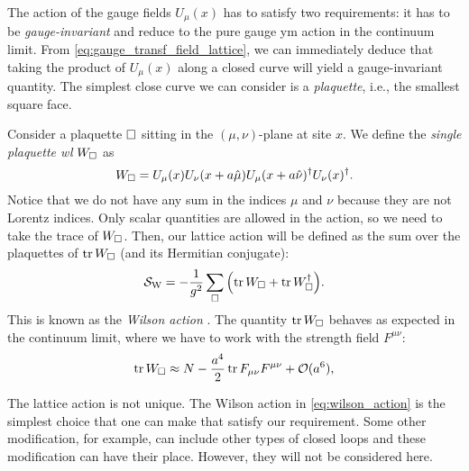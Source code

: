 The action of the gauge fields $U_{\mu}(x)$ has to satisfy two requirements:
it has to be \emph{gauge-invariant} and reduce to the pure gauge \ac{ym} action in the continuum limit.
From \eqref{eq:gauge_transf_field_lattice}, we can immediately deduce that taking the product of $U_{\mu}(x)$ along a closed curve will yield a gauge-invariant quantity.
The simplest close curve we can consider is a \emph{plaquette}, i.e., the smallest square face.

Consider a plaquette $\square$ sitting in the $(\mu, \nu)$-plane at site $x$.
We define the \emph{single plaquette \acl{wl}} $W_{\square}$ as
\begin{equation}
    W_{\square} =
    U_{\mu}(x) U_{\nu}(x + a \hat{\mu}) U_{\mu}(x + a \hat{\nu})^{\dagger} U_{\nu}(x)^{\dagger}.
    \label{eq:single_plaquette_Wilson_loop}
\end{equation}
Notice that we do not have any sum in the indices $\mu$ and $\nu$ because they are not Lorentz indices.
Only scalar quantities are allowed in the action, so we need to take the trace of $W_{\square}$.
Then, our lattice action will be defined as the sum over the plaquettes of $\tr W_{\square}$ (and its Hermitian conjugate):
\begin{equation}
    \mathcal{S}_{\text{W}} = - \frac{1}{g^2} \sum_{\square} \qty( \tr W_{\square} + \tr W_{\square}^{\dagger} ).
    \label{eq:wilson_action}
\end{equation}
This is known as the \emph{Wilson action} \cite{wilson1974confinement, creutz1985book}.
The quantity $\tr W_{\square}$ behaves as expected in the continuum limit, where we have to work with the strength field $F^{\mu \nu}$:
\begin{equation}
    \tr W_{\square} \approx N - \frac{a^{4}}{2} \tr F_{\mu \nu} F^{\mu \nu} + \mathcal{O}(a^6),
\end{equation}

The lattice action is not unique.
The Wilson action in \eqref{eq:wilson_action} is the simplest choice that one can make that satisfy our requirement.
Some other modification, for example, can include other types of closed loops and these modification can have their place.
However, they will not be considered here.

